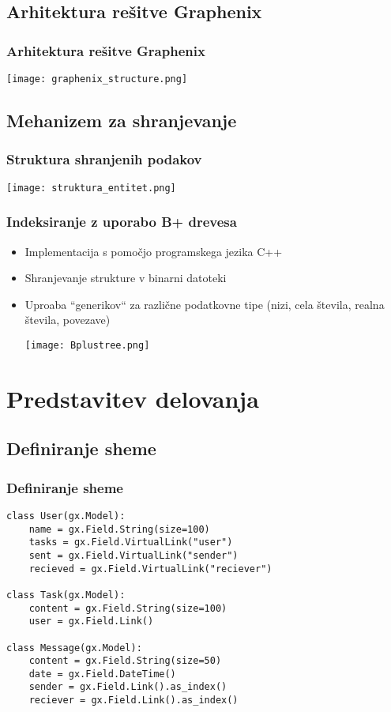 \documentclass{beamer}
\begin{document}
    \subsection{Arhitektura rešitve Graphenix}
    \begin{frame}
    \frametitle{Arhitektura rešitve Graphenix}
        \centering
        \texttt{[image: graphenix\_structure.png]}
    \end{frame}

    \subsection{Mehanizem za shranjevanje}
    \begin{frame}
    \frametitle{Struktura shranjenih podakov}
        \centering
        \texttt{[image: struktura\_entitet.png]}
    \end{frame}

    \begin{frame}
    \frametitle{Indeksiranje z uporabo B+ drevesa}
    \begin{itemize}
        \item Implementacija s pomočjo programskega jezika C++
        \item Shranjevanje strukture v binarni datoteki
        \item Uproaba ``generikov`` za različne podatkovne tipe (nizi, cela števila, realna števila, povezave)
        
        \centering
        \texttt{[image: Bplustree.png]}
    \end{itemize}
    \end{frame}

\section{Predstavitev delovanja}
    \subsection{Definiranje sheme}
    \begin{frame}[fragile]
    \frametitle{Definiranje sheme}
    \footnotesize
        \begin{verbatim}
class User(gx.Model):
    name = gx.Field.String(size=100)
    tasks = gx.Field.VirtualLink("user")
    sent = gx.Field.VirtualLink("sender")
    recieved = gx.Field.VirtualLink("reciever")
    
class Task(gx.Model):
    content = gx.Field.String(size=100)
    user = gx.Field.Link()
    
class Message(gx.Model):
    content = gx.Field.String(size=50)
    date = gx.Field.DateTime()
    sender = gx.Field.Link().as_index()
    reciever = gx.Field.Link().as_index()
        \end{verbatim}
    \end{frame}
\end{document}
